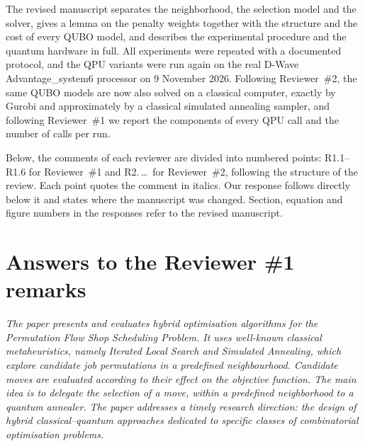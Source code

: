 \documentclass[12pt]{article}
\newenvironment{lead}{\par\medskip\noindent\itshape\renewcommand{\emph}[1]{\textbf{##1}}\ignorespaces}{\par}
\begin{document}
The revised manuscript separates the neighborhood, the selection model and the solver, gives a lemma on the penalty weights together with the structure and the cost of every QUBO model, and describes the experimental procedure and the quantum hardware in full. All experiments were repeated with a documented protocol, and the QPU variants were run again on the real D-Wave Advantage\_system6 processor on 9 November 2026. Following Reviewer~\#2, the same QUBO models are now also solved on a classical computer, exactly by Gurobi and approximately by a classical simulated annealing sampler, and following Reviewer~\#1 we report the components of every QPU call and the number of calls per run.

Below, the comments of each reviewer are divided into numbered points: R1.1--R1.6 for Reviewer~\#1 and R2.\,\dots\ for Reviewer~\#2, following the structure of the review. Each point quotes the comment in italics. Our response follows directly below it and states where the manuscript was changed. Section, equation and figure numbers in the responses refer to the revised manuscript.

\newpage
\section*{Answers to the Reviewer \#1 remarks}

\begin{lead}
The paper presents and evaluates hybrid optimisation algorithms for the Permutation Flow Shop Scheduling Problem. It uses well-known classical metaheuristics, namely Iterated Local Search and Simulated Annealing, which explore candidate job permutations in a predefined neighbourhood. Candidate moves are evaluated according to their effect on the objective function. The main idea is to delegate the selection of a move, within a predefined neighborhood to a quantum annealer. The paper addresses a timely research direction: the design of hybrid classical--quantum approaches dedicated to specific classes of combinatorial optimisation problems.
\end{lead}
\end{document}
